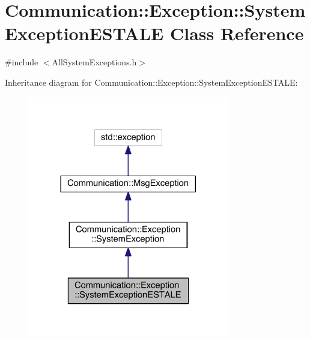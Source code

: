 \hypertarget{class_communication_1_1_exception_1_1_system_exception_e_s_t_a_l_e}{}\section{Communication\+:\+:Exception\+:\+:System\+Exception\+E\+S\+T\+A\+L\+E Class Reference}
\label{class_communication_1_1_exception_1_1_system_exception_e_s_t_a_l_e}


{\ttfamily \#include $<$All\+System\+Exceptions.\+h$>$}



Inheritance diagram for Communication\+:\+:Exception\+:\+:System\+Exception\+E\+S\+T\+A\+L\+E\+:\nopagebreak
\begin{figure}[H]
\begin{center}
\leavevmode
\includegraphics[width=248pt]{class_communication_1_1_exception_1_1_system_exception_e_s_t_a_l_e__inherit__graph}
\end{center}
\end{figure}


